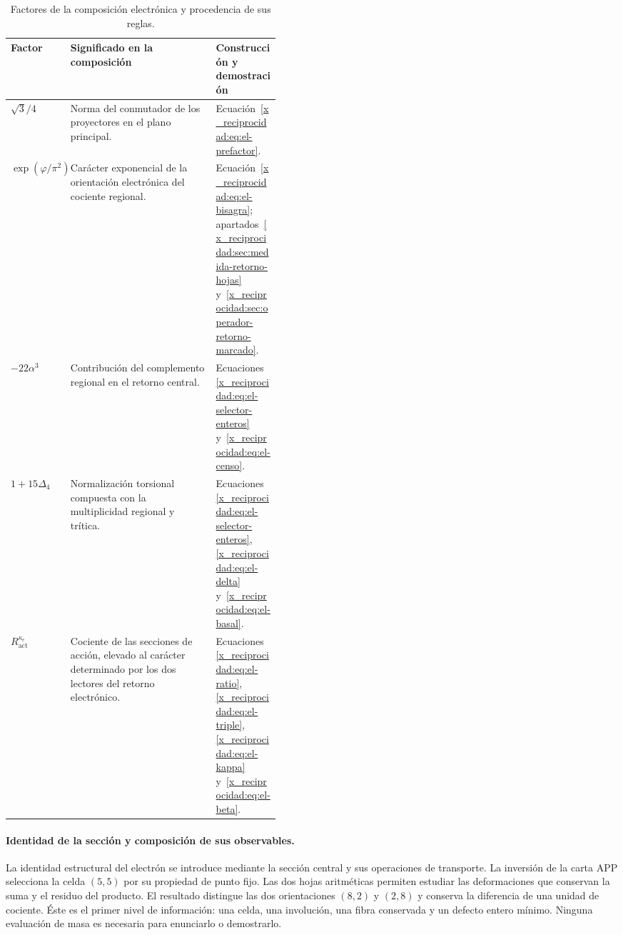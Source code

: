 \begin{table}[htbp]
\centering
\small
\setlength{\tabcolsep}{4pt}
\renewcommand{\arraystretch}{1.18}
\begin{tabularx}{\linewidth}{@{}p{0.20\linewidth}Xp{0.24\linewidth}@{}}
\toprule
Factor & Significado en la composición & Construcción y demostración\\
\midrule
\(\sqrt3/4\)
 & Norma del conmutador de los proyectores en el plano principal.
 & Ecuación~\eqref{x_reciprocidad:eq:el-prefactor}.\\
\(\exp(\varphi/\pi^2)\)
 & Carácter exponencial de la orientación electrónica del cociente regional.
 & Ecuación~\eqref{x_reciprocidad:eq:el-bisagra}; apartados~\ref{x_reciprocidad:sec:medida-retorno-hojas}
   y~\ref{x_reciprocidad:sec:operador-retorno-marcado}.\\
\(-22\alpha^3\)
 & Contribución del complemento regional en el retorno central.
 & Ecuaciones~\eqref{x_reciprocidad:eq:el-selector-enteros} y~\eqref{x_reciprocidad:eq:el-censo}.\\
\(1+15\Delta_4\)
 & Normalización torsional compuesta con la multiplicidad regional
   y trítica.
 & Ecuaciones~\eqref{x_reciprocidad:eq:el-selector-enteros}, \eqref{x_reciprocidad:eq:el-delta}
   y~\eqref{x_reciprocidad:eq:el-basal}.\\
\(R_{\mathrm{act}}^{\kappa_e}\)
 & Cociente de las secciones de acción, elevado al carácter determinado
   por los dos lectores del retorno electrónico.
 & Ecuaciones~\eqref{x_reciprocidad:eq:el-ratio}, \eqref{x_reciprocidad:eq:el-triple},
   \eqref{x_reciprocidad:eq:el-kappa} y~\eqref{x_reciprocidad:eq:el-beta}.\\
\bottomrule
\end{tabularx}
\caption{Factores de la composición electrónica y procedencia de sus reglas.}
\label{x_reciprocidad:tab:el-factores}
\end{table}


\paragraph{Identidad de la sección y composición de sus observables.}
\label{x_reciprocidad:el-ampl-articulacion}
La identidad estructural del electrón se introduce mediante la sección
central y sus operaciones de transporte. La inversión de la carta APP
selecciona la celda $(5,5)$ por su propiedad de punto fijo. Las dos hojas
aritméticas permiten estudiar las deformaciones que conservan la suma y
el residuo del producto. El resultado distingue las dos orientaciones
$(8,2)$ y $(2,8)$ y conserva la diferencia de una unidad de cociente.
Éste es el primer nivel de información: una celda, una involución, una
fibra conservada y un defecto entero mínimo. Ninguna evaluación de masa
es necesaria para enunciarlo o demostrarlo.

